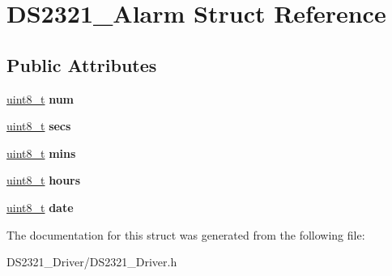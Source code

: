 \hypertarget{structDS2321__Alarm}{}\section{D\+S2321\+\_\+\+Alarm Struct Reference}
\label{structDS2321__Alarm}
\subsection*{Public Attributes}
\begin{DoxyCompactItemize}
\item 
\mbox{\label{structDS2321__Alarm_a2750c6607f91ebbd7a4e30d180dd678f}} 
\hyperlink{vl53l0x__types_8h_aba7bc1797add20fe3efdf37ced1182c5}{uint8\+\_\+t} {\bfseries num}
\item 
\mbox{\label{structDS2321__Alarm_a10adcab730647b566fa366dbdc7de819}} 
\hyperlink{vl53l0x__types_8h_aba7bc1797add20fe3efdf37ced1182c5}{uint8\+\_\+t} {\bfseries secs}
\item 
\mbox{\label{structDS2321__Alarm_a9d32b6d6dae7367dc62468641a321231}} 
\hyperlink{vl53l0x__types_8h_aba7bc1797add20fe3efdf37ced1182c5}{uint8\+\_\+t} {\bfseries mins}
\item 
\mbox{\label{structDS2321__Alarm_a13c023adf145c6f86025052d0d1d7ab7}} 
\hyperlink{vl53l0x__types_8h_aba7bc1797add20fe3efdf37ced1182c5}{uint8\+\_\+t} {\bfseries hours}
\item 
\mbox{\label{structDS2321__Alarm_a9f84bbe57023ce44cc38bce7030eb7a4}} 
\hyperlink{vl53l0x__types_8h_aba7bc1797add20fe3efdf37ced1182c5}{uint8\+\_\+t} {\bfseries date}
\end{DoxyCompactItemize}


The documentation for this struct was generated from the following file\+:\begin{DoxyCompactItemize}
\item 
D\+S2321\+\_\+\+Driver/D\+S2321\+\_\+\+Driver.\+h\end{DoxyCompactItemize}

